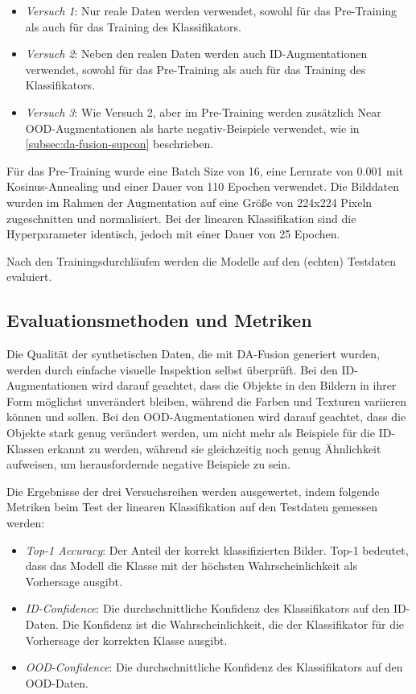 \begin{itemize} %
	\item \emph{Versuch 1}: Nur reale Daten werden verwendet, sowohl für das Pre-Training als auch für das Training des Klassifikators.
	\item \emph{Versuch 2}: Neben den realen Daten werden auch ID-Augmentationen verwendet, sowohl für das Pre-Training als auch für das Training des Klassifikators.
	\item \emph{Versuch 3}: Wie Versuch 2, aber im Pre-Training werden zusätzlich Near OOD-Augmentationen als harte negativ-Beispiele verwendet, wie in \autoref{subsec:da-fusion-supcon} beschrieben.
\end{itemize}

Für das Pre-Training wurde eine Batch Size von 16, eine Lernrate von 0.001 mit Kosinus-Annealing und einer Dauer von 110 Epochen verwendet. Die Bilddaten wurden im Rahmen der Augmentation auf eine Größe von 224x224 Pixeln zugeschnitten und normalisiert. Bei der linearen Klassifikation sind die Hyperparameter identisch, jedoch mit einer Dauer von 25 Epochen.

Nach den Trainingsdurchläufen werden die Modelle auf den (echten) Testdaten evaluiert.

\subsection{Evaluationsmethoden und Metriken} \label{subsec:evaluation}

Die Qualität der synthetischen Daten, die mit DA-Fusion generiert wurden, werden durch einfache visuelle Inspektion selbst überprüft. Bei den ID-Augmentationen wird darauf geachtet, dass die Objekte in den Bildern in ihrer Form möglichst unverändert bleiben, während die Farben und Texturen variieren können und sollen. Bei den OOD-Augmentationen wird darauf geachtet, dass die Objekte stark genug verändert werden, um nicht mehr als Beispiele für die ID-Klassen erkannt zu werden, während sie gleichzeitig noch genug Ähnlichkeit aufweisen, um herausfordernde negative Beispiele zu sein.

Die Ergebnisse der drei Versuchsreihen werden ausgewertet, indem folgende Metriken beim Test der linearen Klassifikation auf den Testdaten gemessen werden:

\begin{itemize}
	\item \emph{Top-1 Accuracy}: Der Anteil der korrekt klassifizierten Bilder. Top-1 bedeutet, dass das Modell die Klasse mit der höchsten Wahrscheinlichkeit als Vorhersage ausgibt.
	\item \emph{ID-Confidence}: Die durchschnittliche Konfidenz des Klassifikators auf den ID-Daten. Die Konfidenz ist die Wahrscheinlichkeit, die der Klassifikator für die Vorhersage der korrekten Klasse ausgibt.
	\item \emph{OOD-Confidence}: Die durchschnittliche Konfidenz des Klassifikators auf den OOD-Daten.
\end{itemize}